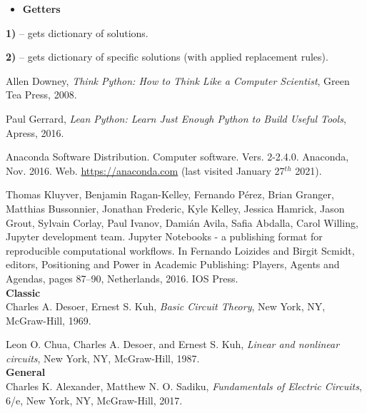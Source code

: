 \documentclass[11pt]{article}
\begin{document}
\begin{itemize}
\item
  \textbf{Getters}
\end{itemize}

\textbf{1)}  \textrm{--} gets dictionary of solutions.

\textbf{2)}  \textrm{--} gets dictionary of
specific solutions (with applied replacement rules).

\newpage
\begin{thebibliography}{9}

 Allen Downey, \textit{Think Python: How to Think Like a Computer Scientist},
Green Tea Press, 2008.

 Paul Gerrard, \textit{Lean Python: Learn Just Enough Python to Build Useful
Tools}, Apress, 2016.

 Anaconda Software Distribution. Computer software. Vers. 2-2.4.0.
Anaconda, Nov. 2016. Web. \url{https://anaconda.com} (last visited
January 27\(^{th}\) 2021).

 Thomas Kluyver, Benjamin Ragan-Kelley, Fernando Pérez, Brian Granger,
Matthias Bussonnier, Jonathan Frederic, Kyle Kelley, Jessica Hamrick,
Jason Grout, Sylvain Corlay, Paul Ivanov, Damián Avila, Safia Abdalla,
Carol Willing, Jupyter development team. Jupyter Notebooks - a
publishing format for reproducible computational workflows. In Fernando
Loizides and Birgit Scmidt, editors, Positioning and Power in Academic
Publishing: Players, Agents and Agendas, pages 87--90, Netherlands,
2016. IOS Press.\\

\textbf{\large Classic}\\

 Charles A. Desoer, Ernest S. Kuh, \textit{Basic Circuit Theory}, New York, NY,
McGraw-Hill, 1969.

 Leon O. Chua, Charles A. Desoer, and Ernest S. Kuh, \textit{Linear and nonlinear
circuits}, New York, NY, McGraw-Hill, 1987.\\

\textbf{\large General}\\

 Charles K. Alexander, Matthew N. O. Sadiku, \textit{Fundamentals of Electric
Circuits}, 6/e, New York, NY, McGraw-Hill, 2017.


\end{thebibliography}
\end{document}
